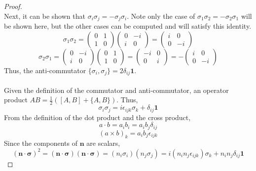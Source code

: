 \begin{sol}
\begin{proof}
\begin{equation}
\end{equation}
Next, it can be shown that $\sigma_i\sigma_j=-\sigma_j\sigma_i$. Note only the case of $\sigma_1\sigma_2=-\sigma_2\sigma_1$ will be shown here, but the other cases can be computed and will satisfy this identity.
\begin{equation}
	\sigma_1\sigma_2=\begin{pmatrix}0&1\\1&0\end{pmatrix}\begin{pmatrix}0&-i\\i&0\end{pmatrix}=\begin{pmatrix}i&0\\0&-i\end{pmatrix}
\end{equation} 
\begin{equation}
	\sigma_2\sigma_1=\begin{pmatrix}0&-i\\i&0\end{pmatrix}\begin{pmatrix}0&1\\1&0\end{pmatrix}=\begin{pmatrix}-i&0\\0&i\end{pmatrix}=-\begin{pmatrix}i&0\\0&-i\end{pmatrix}
\end{equation} 
Thus, the anti-commutator $\{\sigma_i,\sigma_j\}=2\delta_{ij}\mathbf{1}$.\\\\
Given the definition of the commutator and anti-commutator, an operator product $AB=\frac{1}{2}([A,B]+\{A,B\})$. Thus,
\begin{equation}
	\sigma_i\sigma_j=i\epsilon_{ijk}\sigma_k+\delta_{ij}\mathbf{1}
\end{equation}
From the definition of the dot product and the cross product, \begin{equation}
	a\cdot b=a_ib_i=a_ib_j\delta_{ij}
\end{equation} 
\begin{equation}
	(a\times b)_k=a_ib_j\epsilon_{ijk}
\end{equation}
Since the components of $\mathbf{n}$ are scalars, 
\begin{equation}
	(\mathbf{n}\cdot\mathbf{\sigma})^2=(\mathbf{n}\cdot\mathbf{\sigma})(\mathbf{n}\cdot\mathbf{\sigma})=(n_i\sigma_i)(n_j\sigma_j)=i(n_in_j\epsilon_{ijk})\sigma_k+n_in_j\delta_{ij}\mathbf{1}

\end{equation}
\end{proof}
\end{sol}
